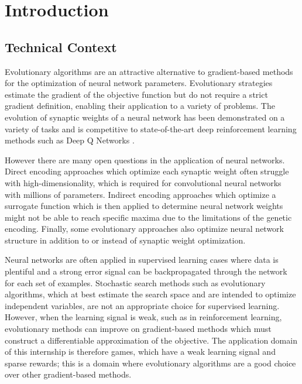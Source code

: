 \chapter*{Introduction}
\label{chap:introduction}

\section*{Technical Context}
Evolutionary algorithms are an attractive alternative to gradient-based methods for the optimization of neural network parameters. Evolutionary strategies \cite{natural-evo-strat} estimate the gradient of the objective function but do not require a strict gradient definition, enabling their application to a variety of problems. The evolution of synaptic weights of a neural network has been demonstrated on a variety of tasks \cite{deep_neuroevo} and is competitive to state-of-the-art deep reinforcement learning methods such as Deep Q Networks \cite{human-lvl-control}. 

However there are many open questions in the application of neural networks. Direct encoding approaches which optimize each synaptic weight often struggle with high-dimensionality, which is required for convolutional neural networks with millions of parameters. Indirect encoding approaches which optimize a surrogate function which is then applied to determine neural network weights might not be able to reach specific maxima due to the limitations of the genetic encoding. Finally, some evolutionary approaches also optimize neural network structure in addition to or instead of synaptic weight optimization. 

Neural networks are often applied in supervised learning cases where data is plentiful and a strong error signal can be backpropagated through the network for each set of examples. Stochastic search methods such as evolutionary algorithms, which at best estimate the search space and are intended to optimize independent variables, are not an appropriate choice for supervised learning. However, when the learning signal is weak, such as in reinforcement learning, evolutionary methods can improve on gradient-based methods which must construct a differentiable approximation of the objective. The application domain of this internship is therefore games, which have a weak learning signal and sparse rewards; this is a domain where evolutionary algorithms are a good choice over other gradient-based methods.

